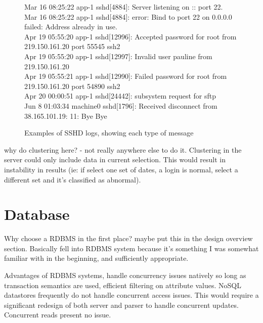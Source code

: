\begin{figure}[tbh]
\parbox{.99\textwidth}{
{\small Mar 16 08:25:22 app-1 sshd[4884]: Server listening on :: port 22. \\
Mar 16 08:25:22 app-1 sshd[4884]: error: Bind to port 22 on 0.0.0.0 failed: Address already in use. \\
Apr 19 05:55:20 app-1 sshd[12996]: Accepted password for root from 219.150.161.20 port 55545 ssh2 \\
Apr 19 05:55:20 app-1 sshd[12997]: Invalid user pauline from 219.150.161.20 \\
Apr 19 05:55:21 app-1 sshd[12990]: Failed password for root from 219.150.161.20 port 54890 ssh2 \\
Apr 20 00:00:51 app-1 sshd[24442]: subsystem request for sftp \\
Jun 8 01:03:34 machine0 sshd[1796]: Received disconnect from 38.165.101.19: 11: Bye Bye \\}}
\caption{Examples of SSHD logs, showing each type of message}
\label{log_examples}
\end{figure}



why do clustering here? - not really anywhere else to do it. Clustering in the server could only include data in current selection. This would result in instability in results (ie: if select one set of dates, a login is normal, select a different set and it's classified as abnormal). 

\section{Database} 

Why choose a RDBMS in the first place? maybe put this in the design overview section. Basically fell into RDBMS system because it's something I was somewhat familiar with in the beginning, and sufficiently appropriate.

Advantages of RDBMS systems, handle concurrency issues natively so long as transaction semantics are used, efficient filtering on attribute values. NoSQL datastores frequently do not handle concurrent access issues. This would require a significant redesign of both server and parser to handle concurrent updates. Concurrent reads present no issue. 

